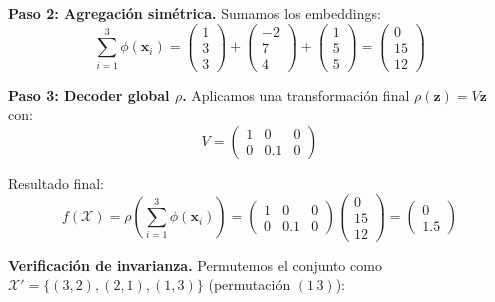 \begin{example}
\textbf{Paso 2: Agregación simétrica.} Sumamos los embeddings:
\begin{equation}
\sum_{i=1}^3 \phi(\mathbf{x}_i) = \begin{pmatrix} 1 \\ 3 \\ 3 \end{pmatrix} + \begin{pmatrix} -2 \\ 7 \\ 4 \end{pmatrix} + \begin{pmatrix} 1 \\ 5 \\ 5 \end{pmatrix} = \begin{pmatrix} 0 \\ 15 \\ 12 \end{pmatrix}
\end{equation}

\textbf{Paso 3: Decoder global $\rho$.} Aplicamos una transformación final $\rho(\mathbf{z}) = V\mathbf{z}$ con:
\begin{equation}
V = \begin{pmatrix} 1 & 0 & 0 \\ 0 & 0.1 & 0 \end{pmatrix}
\end{equation}

Resultado final:
\begin{equation}
f(\mathcal{X}) = \rho\left(\sum_{i=1}^3 \phi(\mathbf{x}_i)\right) = \begin{pmatrix} 1 & 0 & 0 \\ 0 & 0.1 & 0 \end{pmatrix} \begin{pmatrix} 0 \\ 15 \\ 12 \end{pmatrix} = \begin{pmatrix} 0 \\ 1.5 \end{pmatrix}
\end{equation}

\textbf{Verificación de invarianza.} Permutemos el conjunto como $\mathcal{X}' = \{(3,2), (2,1), (1,3)\}$ (permutación $(1\,3)$):


\end{example}
